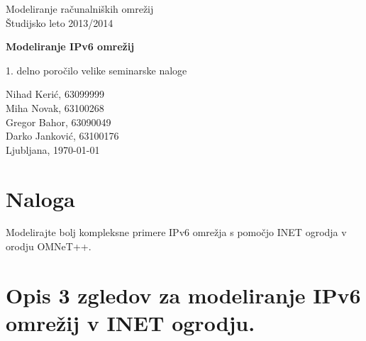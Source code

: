 \documentclass[11pt,a4paper,slovene]{myarticle}
\begin{document}
\label{naslov}
\thispagestyle{empty}

\begin{center}
\begin{Large}
Modeliranje računalniških omrežij\\
Študijsko leto 2013/2014\\
\end{Large}

\vspace*{4cm}
\begin{LARGE}
\textbf{Modeliranje IPv6 omrežij\\}
\end{LARGE}
\vspace*{0.5cm}

\begin{Large}
1. delno poročilo velike seminarske naloge\\

\vspace*{4cm}

Nihad Kerić, 63099999\\
Miha Novak, 63100268\\
Gregor Bahor, 63090049\\
Darko Janković, 63100176\\

\vspace*{5cm}
Ljubljana, \today
\end{Large}
\end{center}

\pagebreak
\setcounter{page}{1}


\label{Kazalo}
\tableofcontents
\thispagestyle{empty}
\pagebreak

\section{Naloga}
Modelirajte bolj kompleksne primere IPv6 omrežja s pomočjo INET ogrodja v orodju OMNeT++. 

\section{Opis 3 zgledov za modeliranje IPv6 omrežij v INET ogrodju.}
\end{document}
